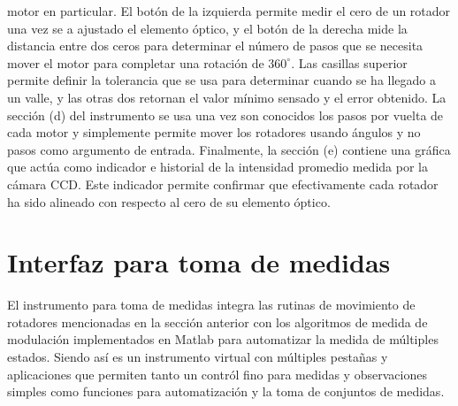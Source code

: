 motor en particular. El botón de la izquierda permite medir el cero de
un rotador una vez se a ajustado el elemento óptico, y el botón de la
derecha mide la distancia entre dos ceros para determinar el número de
pasos que se necesita mover el motor para completar una rotación de
$360^{\circ}$. Las casillas superior permite definir la
tolerancia que se usa para determinar cuando se ha llegado a un valle,
y las otras dos retornan el valor mínimo sensado y el error obtenido. 
La sección (d) del instrumento se usa una vez son conocidos los pasos
por vuelta de cada motor y simplemente permite mover los rotadores
usando ángulos y no pasos como argumento de entrada. Finalmente, la
sección (e) contiene una gráfica que actúa como indicador e historial
de la intensidad promedio medida por la cámara CCD. Este indicador
permite confirmar que efectivamente cada rotador ha sido alineado
con respecto al cero de su elemento óptico. 

\section{Interfaz para toma de medidas}

El instrumento para toma de medidas integra las rutinas de movimiento
de rotadores mencionadas en la sección anterior con los algoritmos de
medida de modulación implementados en Matlab para automatizar la
medida de múltiples estados. Siendo así es un instrumento virtual con
múltiples pestañas y aplicaciones que permiten tanto un contról
fino para medidas y observaciones simples como funciones para automatización y la
toma de conjuntos de medidas. 

